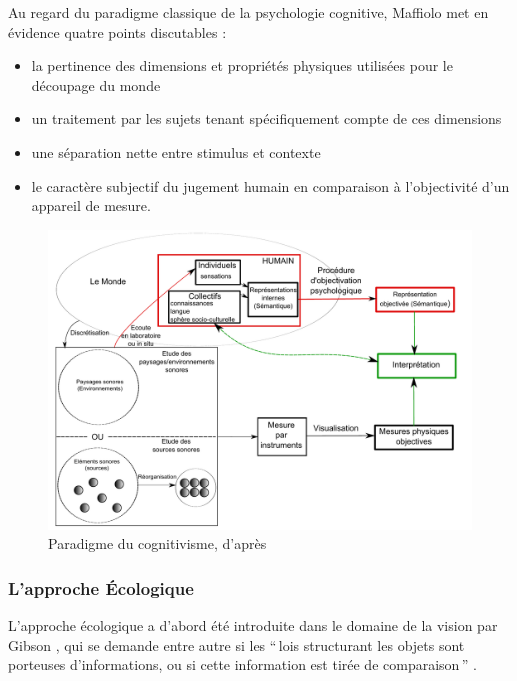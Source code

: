 Au regard du paradigme classique de la psychologie cognitive, Maffiolo met en évidence quatre points discutables :

\begin{itemize}
\item la pertinence des dimensions et propriétés physiques utilisées pour le découpage du monde
\item un traitement par les sujets tenant spécifiquement compte de ces dimensions
\item une séparation nette entre stimulus et contexte
\item le caractère subjectif du jugement humain en comparaison à l'objectivité d'un appareil de mesure.
\end{itemize}

\begin{figure}[bth]
        \myfloatalign
        \includegraphics[width=\linewidth]{gfx/Shema_maffiolo}
        \caption[Paradigme du cognitivisme]{Paradigme du cognitivisme, d'après \citep{maffiolo_caracterisation_1999}}\label{fig:paradigmeCognitivisme}
\end{figure}

\subsubsection{L'approche Écologique}
\label{sec:ecologique}

L'approche écologique a d'abord été introduite dans le domaine de la vision par Gibson \citep{gibson1966senses}, qui se demande entre autre si les ``\,lois structurant les objets sont porteuses d'informations, ou si cette information est tirée de comparaison\,'' \citep{gibson1978ecological}.

